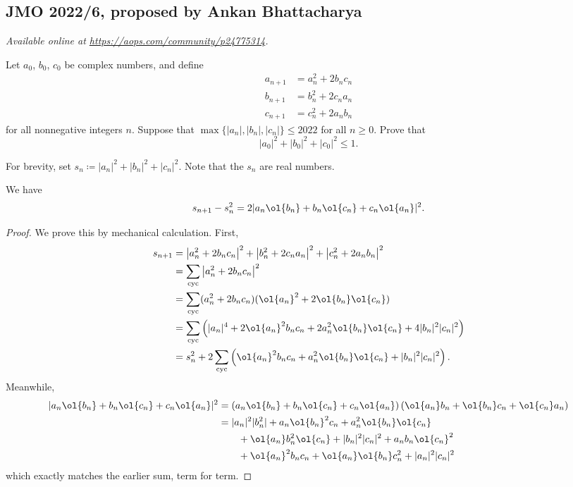 \documentclass[11pt]{scrartcl}
\begin{document}
\subsection{JMO 2022/6, proposed by Ankan Bhattacharya}
\textsl{Available online at \url{https://aops.com/community/p24775314}.}
\begin{mdframed}[style=mdpurplebox,frametitle={Problem statement}]
Let $a_0$, $b_0$, $c_0$ be complex numbers, and define
\begin{align*}
  a_{n+1} &= a_n^2 + 2b_nc_n \\
  b_{n+1} &= b_n^2 + 2c_na_n \\
  c_{n+1} &= c_n^2 + 2a_nb_n
\end{align*}
for all nonnegative integers $n$.
Suppose that $\max{\{|a_n|, |b_n|, |c_n|\}} \leq 2022$ for all $n \ge 0$.
Prove that \[ |a_0|^2 + |b_0|^2 + |c_0|^2 \leq 1. \]
\end{mdframed}
For brevity, set $s_n \coloneqq |a_n|^2 + |b_n|^2 + |c_n|^2$.
Note that the $s_n$ are real numbers.
\begin{claim*}
  We have
  \[ s_{n+1} - s_n^2 = 2 |a_n \ol{b_n} + b_n \ol{c_n} + c_n \ol{a_n}|^2. \]
\end{claim*}
\begin{proof}
  We prove this by mechanical calculation. First,
  \begin{align*}
    s_{n+1} &= \left\lvert a_n^2+2b_nc_n \right\rvert^2 +
    \left\lvert b_n^2+2c_na_n \right\rvert^2 +
    \left\lvert c_n^2+2a_nb_n \right\rvert^2 \\
    &= \sum_{\text{cyc}} \left\lvert a_n^2+2b_nc_n \right\rvert^2 \\
    &= \sum_{\text{cyc}} (a_n^2+2b_nc_n)(\ol{a_n}^2 + 2\ol{b_n}\ol{c_n}) \\
    &= \sum_{\text{cyc}} \left( |a_n|^4 + 2 \ol{a_n}^2 b_nc_n
      + 2a_n^2 \ol{b_n} \ol{c_n}  + 4 |b_n|^2 |c_n|^2 \right) \\
      &= s_n^2 + 2 \sum_{\text{cyc}}
      \left( \ol{a_n}^2 b_nc_n
      + a_n^2 \ol{b_n} \ol{c_n} + |b_n|^2 |c_n|^2 \right).
  \end{align*}
  Meanwhile,
	\begin{align*}
		|a_n \ol{b_n} + b_n \ol{c_n} + c_n \ol{a_n}|^2
		&= \left( a_n \ol{b_n} + b_n \ol{c_n} + c_n \ol{a_n} \right)
		\left( \ol{a_n} b_n + \ol{b_n} c_n + \ol{c_n} a_n \right) \\
		&= |a_n|^2 |b_n^2| + a_n \ol{b_n}^2 c_n + a_n^2 \ol{b_n} \ol{c_n} \\
		&\qquad + \ol{a_n} b_n^2 \ol{c_n} + |b_n|^2 |c_n|^2 + a_n b_n \ol{c_n}^2 \\
		&\qquad + \ol{a_n}^2 b_n c_n + \ol{a_n} \ol{b_n} c_n^2 + |a_n|^2 |c_n|^2
	\end{align*}
	which exactly matches the earlier sum, term for term.
\end{proof}
\end{document}
